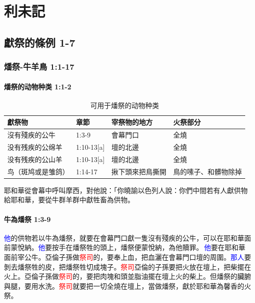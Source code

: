 \chapter{利未記}

\section{獻祭的條例 1-7}
\subsection{燔祭-牛羊鳥 1:1-17}

\subsubsection{燔祭的动物种类 1:1-2}
\noindent
\begin{table}
\vspace{-22mm}
\centering
\begin{tabular}{l|l|l|l}\hline\hline
    獻祭物  & 章節 & 宰祭物的地方& 火祭部分 \\ \hline
沒有殘疾的公牛   & 1:3-9  &會幕門口 & 全燒 \\ \hline
没有残疾的公绵羊&1:10-13[a] &壇的北邊 & 全燒\\\hline
没有残疾的公山羊&1:10-13[a]&壇的北邊 & 全燒 \\\hline
鸟（斑鸠或是雏鸽）& 1:14-17 &揪下頭來把鳥撕開& 鳥的嗉子、和髒物除掉\\\hline
\end{tabular}
\caption{可用于燔祭的动物种类}
\end{table}
耶和華從會幕中呼叫摩西，對他說：「你曉諭以色列人說：你們中間若有人獻供物給耶和華，要從牛群羊群中獻牲畜為供物。

\subsubsection{牛為燔祭 1:3-9}

\textcolor{blue}{他}的供物若以牛為燔祭，就要在會幕門口獻一隻沒有殘疾的公牛，可以在耶和華面前蒙悅納。\textcolor{blue}{他}要按手在燔祭牲的頭上，燔祭便蒙悅納，為他贖罪。 \textcolor{blue}{他}要在耶和華面前宰公牛。亞倫子孫做\textcolor{red}{祭司}的，要奉上血，把血灑在會幕門口壇的周圍。\textcolor{blue}{那人}要剝去燔祭牲的皮，把燔祭牲切成塊子。\textcolor{red}{祭司}亞倫的子孫要把火放在壇上，把柴擺在火上。亞倫子孫做\textcolor{red}{祭司}的，要把肉塊和頭並脂油擺在壇上火的柴上。但燔祭的臟腑與腿，要用水洗。\textcolor{red}{祭司}就要把一切全燒在壇上，當做燔祭，獻於耶和華為馨香的火祭。

